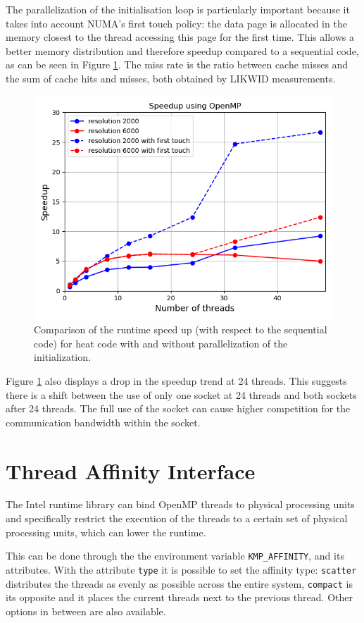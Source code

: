 The parallelization of the initialisation loop is particularly important because it takes into account NUMA's first touch policy: the data page is allocated in the memory closest to the thread accessing this page for the first time. This allows a better memory distribution and therefore speedup compared to a sequential code, as can be seen in Figure \ref{fig:first-touch}. 
The miss rate is the ratio between cache misses and the sum of cache hits and misses, both obtained by LIKWID measurements.

\begin{figure}[h]
    \centering
    \includegraphics[width=0.7\linewidth]{figures/first_touch.png}
    \caption{Comparison of the runtime speed up (with respect to the sequential code) for heat code with and without parallelization of the initialization.}
    \label{fig:first-touch}
\end{figure}

Figure \ref{fig:first-touch} also displays a drop in the speedup trend at 24 threads. This suggests there is a shift between the use of only one socket at 24 threads and both sockets after 24 threads. The full use of the socket can cause higher competition for the communication bandwidth within the socket.


\section*{Thread Affinity Interface}
The Intel runtime library can bind OpenMP threads to physical processing units and specifically restrict the execution of the threads to a certain set of physical processing units, which can lower the runtime.

This can be done through the the environment variable \verb|KMP_AFFINITY|, and its attributes. With the attribute \verb|type| it is possible to set the affinity type: \verb|scatter| distributes the threads as evenly as possible across the entire system, \verb|compact| is its opposite and it places the current threads next to the previous thread. Other options in between are also available. 


